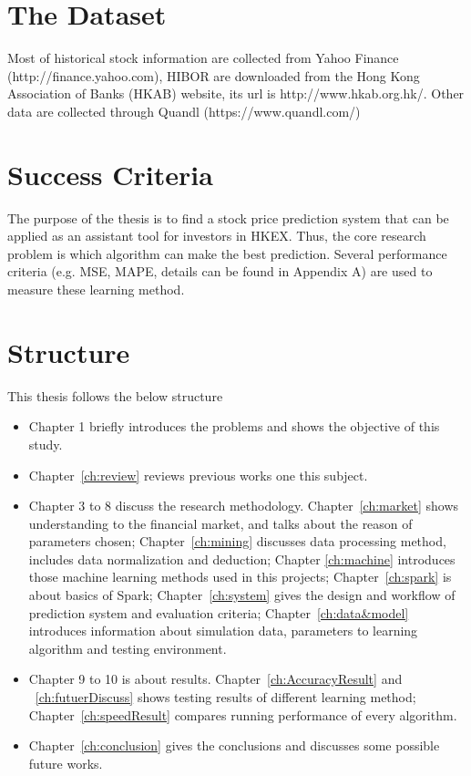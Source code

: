 \section{The Dataset}
Most of historical stock information are collected from Yahoo Finance (http://finance.yahoo.com), HIBOR are downloaded from the Hong Kong Association of Banks (HKAB) website, its url is http://www.hkab.org.hk/. Other data are collected through Quandl (https://www.quandl.com/)

\section{Success Criteria}
The purpose of the thesis is to find a stock price prediction system that can be applied as an assistant tool for investors in HKEX. Thus, the core research problem is which algorithm can make the best prediction. Several performance criteria (e.g. MSE, MAPE, details can be found in Appendix A) are used to measure these learning method.


\section{Structure}


This thesis follows the below structure\par
\begin{itemize}
	\item Chapter 1 briefly introduces the problems and shows the objective of this study.
	\item Chapter~\ref{ch:review} reviews previous works one this subject.
	\item Chapter 3 to 8 discuss the research methodology. Chapter~\ref{ch:market} shows understanding to the financial market, and talks about the reason of parameters chosen; Chapter~\ref{ch:mining} discusses data processing method, includes data normalization and deduction; Chapter \ref{ch:machine} introduces those machine learning methods used in this projects; Chapter~\ref{ch:spark} is about basics of Spark; Chapter~\ref{ch:system} gives the design and workflow of prediction system and evaluation criteria; Chapter~\ref{ch:data&model} introduces information about simulation data, parameters to learning algorithm and testing environment.
	\item Chapter 9 to 10 is about results.  Chapter~\ref{ch:AccuracyResult} and ~\ref{ch:futuerDiscuss} shows testing results of different learning method; Chapter~\ref{ch:speedResult} compares running performance of every algorithm.
	\item Chapter~\ref{ch:conclusion} gives the conclusions and discusses some possible future works.
\end{itemize}


